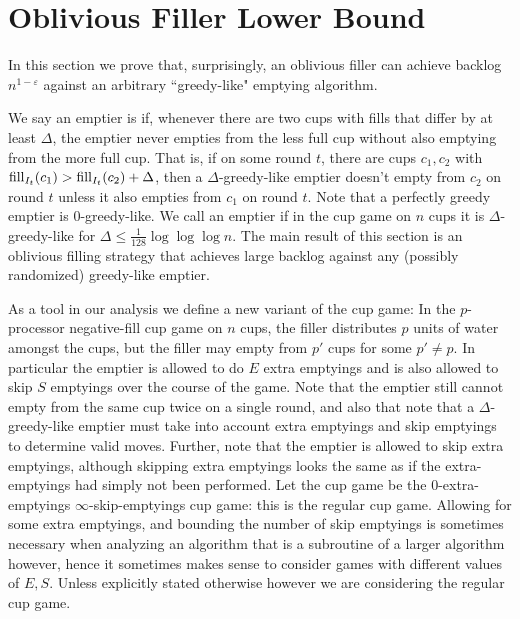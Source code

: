 \section{Oblivious Filler Lower Bound}\label{sec:oblivious}
In this section we prove that, surprisingly, an oblivious filler can
achieve backlog $n^{1-\varepsilon}$ against an arbitrary
``greedy-like" emptying algorithm.

We say an emptier is  if, whenever there
are two cups with fills that differ by at least $\Delta$, the emptier
never empties from the less full cup without also emptying from the
more full cup. That is, if on some round $t$, there are cups
$c_1, c_2$ with $\operatorname{\text{\textup{fill}}}_{I_t}(c_1) > \operatorname{\text{\textup{fill}}}_{I_t}(c_2) + \Delta$, then a
$\Delta$-greedy-like emptier doesn't empty from $c_2$ on round $t$
unless it also empties from $c_1$ on round $t$. Note that a perfectly
greedy emptier is $0$-greedy-like. We call an emptier
 if in the cup game on $n$ cups it is
$\Delta$-greedy-like for $\Delta \le \frac{1}{128} \log\log\log
n$. The main result of this section is an oblivious filling strategy
that achieves large backlog against any (possibly randomized)
greedy-like emptier.


As a tool in our analysis we define a new variant of the cup game: In
the $p$-processor  
negative-fill cup game on $n$ cups, the filler distributes $p$ units
of water amongst the cups, but the filler may empty from $p'$ cups for
some $p' \neq p$. In particular the emptier is allowed to do $E$ extra
emptyings and is also allowed to skip $S$ emptyings over the course of
the game. Note that the emptier still cannot empty from the same cup
twice on a single round, and also that note that a
$\Delta$-greedy-like emptier must take into account extra emptyings
and skip emptyings to determine valid moves. Further, note that the
emptier is allowed to skip extra emptyings, although skipping extra
emptyings looks the same as if the extra-emptyings had simply not been
performed.  Let the  cup game be the $0$-extra-emptyings
$\infty$-skip-emptyings cup game: this is the regular cup game.
Allowing for some extra emptyings, and bounding the number of skip
emptyings is sometimes necessary when analyzing an algorithm that is a
subroutine of a larger algorithm however, hence it sometimes makes
sense to consider games with different values of $E,S$. Unless
explicitly stated otherwise however we are considering the regular cup
game.

